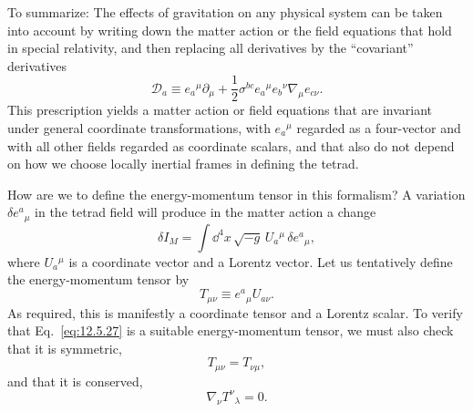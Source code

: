 To summarize: The effects of gravitation on any physical system can be taken
into account by writing down the matter action or the field equations that
hold in special relativity, and then replacing all derivatives by the
``covariant'' derivatives
\begin{equation}
  \mathcal D_a
  \equiv
  e_a{}^\mu\partial_\mu
  +\frac12\sigma^{bc}e_a{}^\mu e_b{}^\nu
   \nabla_\mu e_{c\nu}.
  \tag{12.5.25}\label{eq:12.5.25}
\end{equation}
This prescription yields a matter action or field equations that are
invariant under general coordinate transformations, with \(e_a{}^\mu\)
regarded as a four-vector and with all other fields regarded as coordinate
scalars, and that also do not depend on how we choose locally inertial frames
in defining the tetrad.

How are we to define the energy-momentum tensor in this formalism? A
variation \(\delta e^a{}_\mu\) in the tetrad field will produce in the matter
action a change
\begin{equation}
  \delta I_M
  =
  \int\dd^4x\,\sqrt{-g}\,
  U_a{}^\mu\,\delta e^a{}_\mu,
  \tag{12.5.26}\label{eq:12.5.26}
\end{equation}
where \(U_a{}^\mu\) is a coordinate vector and a Lorentz vector. Let us
tentatively define the energy-momentum tensor by
\begin{equation}
  T_{\mu\nu}
  \equiv
  e^a{}_\mu U_{a\nu}.
  \tag{12.5.27}\label{eq:12.5.27}
\end{equation}
As required, this is manifestly a coordinate tensor and a Lorentz scalar. To
verify that Eq.~\eqref{eq:12.5.27} is a suitable energy-momentum tensor, we
must also check that it is symmetric,
\begin{equation}
  T_{\mu\nu}=T_{\nu\mu},
  \tag{12.5.28}\label{eq:12.5.28}
\end{equation}
and that it is conserved,
\begin{equation}
  \nabla_\nu T^\nu{}_\lambda=0.
  \tag{12.5.29}\label{eq:12.5.29}
\end{equation}

